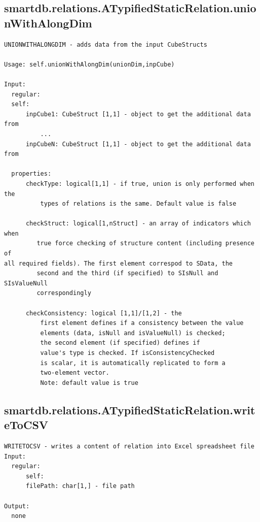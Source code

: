 \documentclass[letterpaper,10pt,english]{sphinxmanual}
\begin{document}
\subsection{smartdb.relations.ATypifiedStaticRelation.unionWithAlongDim}
\label{chap_functions:smartdb-relations-atypifiedstaticrelation-unionwithalongdim}
\begin{Verbatim}[commandchars=\\\{\}]
UNIONWITHALONGDIM - adds data from the input CubeStructs

Usage: self.unionWithAlongDim(unionDim,inpCube)

Input:
  regular:
  self:
      inpCube1: CubeStruct [1,1] - object to get the additional data from
          ...
      inpCubeN: CubeStruct [1,1] - object to get the additional data from

  properties:
      checkType: logical[1,1] - if true, union is only performed when the
          types of relations is the same. Default value is false

      checkStruct: logical[1,nStruct] - an array of indicators which when
         true force checking of structure content (including presence of
all required fields). The first element correspod to SData, the
         second and the third (if specified) to SIsNull and SIsValueNull
         correspondingly

      checkConsistency: logical [1,1]/[1,2] - the
          first element defines if a consistency between the value
          elements (data, isNull and isValueNull) is checked;
          the second element (if specified) defines if
          value's type is checked. If isConsistencyChecked
          is scalar, it is automatically replicated to form a
          two-element vector.
          Note: default value is true
\end{Verbatim}


\subsection{smartdb.relations.ATypifiedStaticRelation.writeToCSV}
\label{chap_functions:smartdb-relations-atypifiedstaticrelation-writetocsv}
\begin{Verbatim}[commandchars=\\\{\}]
WRITETOCSV - writes a content of relation into Excel spreadsheet file
Input:
  regular:
      self:
      filePath: char[1,] - file path

Output:
  none
\end{Verbatim}
\end{document}
